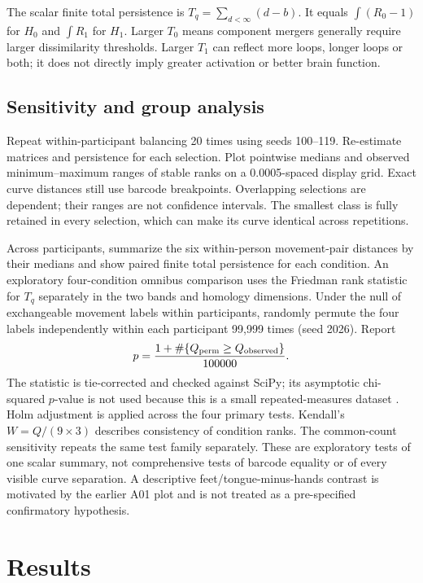 \documentclass[11pt,a4paper]{article}
\begin{document}
The scalar finite total persistence is $T_q=\sum_{d<\infty}(d-b)$. It equals $\int(R_0-1)$ for $H_0$ and $\int R_1$ for $H_1$. Larger $T_0$ means component mergers generally require larger dissimilarity thresholds. Larger $T_1$ can reflect more loops, longer loops or both; it does not directly imply greater activation or better brain function.

\subsection{Sensitivity and group analysis}
Repeat within-participant balancing 20 times using seeds 100--119. Re-estimate matrices and persistence for each selection. Plot pointwise medians and observed minimum--maximum ranges of stable ranks on a 0.0005-spaced display grid. Exact curve distances still use barcode breakpoints. Overlapping selections are dependent; their ranges are not confidence intervals. The smallest class is fully retained in every selection, which can make its curve identical across repetitions.

Across participants, summarize the six within-person movement-pair distances by their medians and show paired finite total persistence for each condition. An exploratory four-condition omnibus comparison uses the Friedman rank statistic for $T_q$ separately in the two bands and homology dimensions. Under the null of exchangeable movement labels within participants, randomly permute the four labels independently within each participant 99,999 times (seed 2026). Report
\begin{equation}
 p=\frac{1+\#\{Q_{\rm perm}\geq Q_{\rm observed}\}}{100000}.
\end{equation}
The statistic is tie-corrected and checked against SciPy; its asymptotic chi-squared $p$-value is not used because this is a small repeated-measures dataset \cite{friedman}. Holm adjustment is applied across the four primary tests. Kendall's $W=Q/(9\times3)$ describes consistency of condition ranks. The common-count sensitivity repeats the same test family separately. These are exploratory tests of one scalar summary, not comprehensive tests of barcode equality or of every visible curve separation. A descriptive feet/tongue-minus-hands contrast is motivated by the earlier A01 plot and is not treated as a pre-specified confirmatory hypothesis.

\section{Results}

\end{document}
